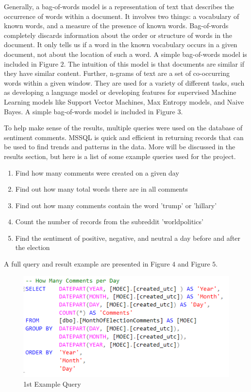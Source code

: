 \documentclass[letterpaper]{article}
\begin{document}
Generally, a bag-of-words model is a representation of text that describes the occurrence of words within a document. It involves two things: a vocabulary of known words, and a measure of the presence of known words. Bag-of-words completely discards information about the order or structure of words in the document. It only tells us if a word in the known vocabulary occurs in a given document, not about the location of such a word. A simple bag-of-words model is included in Figure $2$. The intuition of this model is that documents are similar if they have similar content. Further, n-grams of text are a set of co-occurring words within a given window. They are used for a variety of different tasks, such as developing a language model or developing features for supervised Machine Learning models like Support Vector Machines, Max Entropy models, and Naive Bayes. A simple bag-of-words model is included in Figure $3$.

To help make sense of the results, multiple queries were used on the database of sentiment comments. MSSQL is quick and efficient in returning records that can be used to find trends and patterns in the data. More will be discussed in the results section, but here is a list of some example queries used for the project.

\begin{enumerate}
    \item Find how many comments were created on a given day
    \item Find out how many total words there are in all comments
    \item Find out how many comments contain the word 'trump' or 'hillary'
    \item Count the number of records from the subreddit 'worldpolitics'
    \item Find the sentiment of positive, negative, and neutral a day before and after the election
\end{enumerate}

A full query and result example are presented in Figure $4$ and Figure $5$.

\begin{figure}[!htb]
\begin{center}
\includegraphics[scale=0.7]{example_query.PNG}
\caption{1st Example Query}
\label{fig1}
\end{center}
\end{figure}
\end{document}
